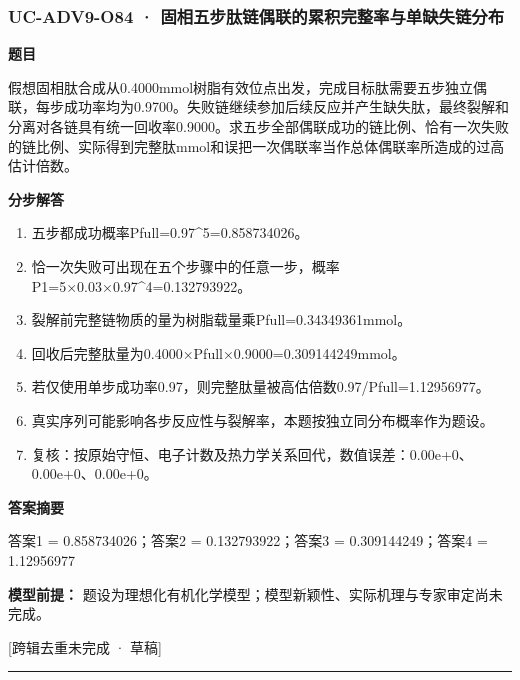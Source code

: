 \documentclass[UTF8,11pt,a4paper]{ctexart}
\begin{document}
\subsubsection*{UC-ADV9-O84 · 固相五步肽链偶联的累积完整率与单缺失链分布}
\noindent\textbf{题目}\par
假想固相肽合成从0.4000mmol树脂有效位点出发，完成目标肽需要五步独立偶联，每步成功率均为0.9700。失败链继续参加后续反应并产生缺失肽，最终裂解和分离对各链具有统一回收率0.9000。求五步全部偶联成功的链比例、恰有一次失败的链比例、实际得到完整肽mmol和误把一次偶联率当作总体偶联率所造成的过高估计倍数。\par
\medskip\noindent\textbf{分步解答}
\begin{enumerate}
\item 五步都成功概率Pfull=0.97\textasciicircum{}5=0.858734026。
\item 恰一次失败可出现在五个步骤中的任意一步，概率P1=5×0.03×0.97\textasciicircum{}4=0.132793922。
\item 裂解前完整链物质的量为树脂载量乘Pfull=0.34349361mmol。
\item 回收后完整肽量为0.4000×Pfull×0.9000=0.309144249mmol。
\item 若仅使用单步成功率0.97，则完整肽量被高估倍数0.97/Pfull=1.12956977。
\item 真实序列可能影响各步反应性与裂解率，本题按独立同分布概率作为题设。
\item 复核：按原始守恒、电子计数及热力学关系回代，数值误差：0.00e+0、0.00e+0、0.00e+0。
\end{enumerate}
\noindent\textbf{答案摘要}\par
答案1 = 0.858734026；答案2 = 0.132793922；答案3 = 0.309144249；答案4 = 1.12956977\par
\noindent\textbf{模型前提：}
题设为理想化有机化学模型；模型新颖性、实际机理与专家审定尚未完成。\par
\noindent\textcolor{red!65!black}{[跨辑去重未完成 · 草稿]} \par
\medskip\hrule\medskip
{}
\end{document}
